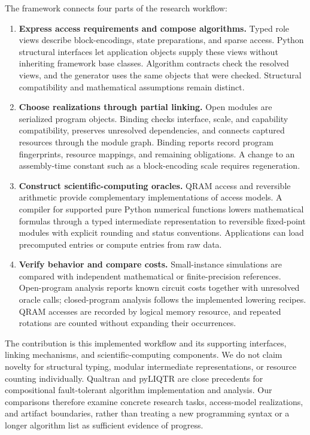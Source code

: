 The framework connects four parts of the research workflow:
\begin{enumerate}
\item \textbf{Express access requirements and compose algorithms.}
  Typed role views describe block-encodings, state preparations, and sparse
  access. Python structural interfaces let application objects supply these
  views without inheriting framework base classes. Algorithm contracts
  check the resolved views, and the generator uses the same objects that
  were checked. Structural compatibility and mathematical assumptions
  remain distinct.
\item \textbf{Choose realizations through partial linking.}
  Open modules are serialized program objects. Binding checks interface,
  scale, and capability compatibility, preserves unresolved dependencies,
  and connects captured resources through the module graph. Binding
  reports record program fingerprints, resource mappings, and remaining
  obligations. A change to an assembly-time constant such as a
  block-encoding scale requires regeneration.
\item \textbf{Construct scientific-computing oracles.}
  QRAM access and reversible arithmetic provide complementary
  implementations of access models. A compiler for supported pure Python
  numerical functions lowers mathematical formulas through a typed
  intermediate representation to reversible fixed-point modules with
  explicit rounding and status conventions. Applications can load
  precomputed entries or compute entries from raw data.
\item \textbf{Verify behavior and compare costs.}
  Small-instance simulations are compared with independent mathematical
  or finite-precision references. Open-program analysis reports known
  circuit costs together with unresolved oracle calls; closed-program
  analysis follows the implemented lowering recipes. QRAM accesses are
  recorded by logical memory resource, and repeated rotations are counted
  without expanding their occurrences.
\end{enumerate}

The contribution is this implemented workflow and its supporting
interfaces, linking mechanisms, and scientific-computing components.
We do not claim novelty for structural typing, modular intermediate
representations, or resource counting individually. Qualtran
\cite{harrigan2024qualtran} and pyLIQTR \cite{obenland2026pyliqtr}
are close precedents for compositional fault-tolerant algorithm
implementation and analysis. Our comparisons therefore examine concrete
research tasks, access-model realizations, and artifact boundaries, rather
than treating a new programming syntax or a longer algorithm list as
sufficient evidence of progress.

